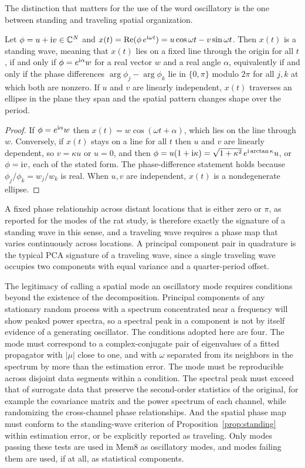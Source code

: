 The distinction that matters for the use of the word oscillatory is the one between standing and traveling spatial organization.

\begin{proposition}\label{prop:standing}
Let $\phi=u+\mathrm{i} v\in\mathbb{C}^N$ and $x(t)=\operatorname{Re}(\phi\,e^{\mathrm{i}\omega t})=u\cos\omega t-v\sin\omega t$. Then $x(t)$ is a standing wave, meaning that $x(t)$ lies on a fixed line through the origin for all $t$, if and only if $\phi=e^{\mathrm{i}\alpha}w$ for a real vector $w$ and a real angle $\alpha$, equivalently if and only if the phase differences $\arg\phi_j-\arg\phi_k$ lie in $\{0,\pi\}$ modulo $2\pi$ for all $j,k$ at which both are nonzero. If $u$ and $v$ are linearly independent, $x(t)$ traverses an ellipse in the plane they span and the spatial pattern changes shape over the period.
\end{proposition}

\begin{proof}
If $\phi=e^{\mathrm{i}\alpha}w$ then $x(t)=w\cos(\omega t+\alpha)$, which lies on the line through $w$. Conversely, if $x(t)$ stays on a line for all $t$ then $u$ and $v$ are linearly dependent, so $v=\kappa u$ or $u=0$, and then $\phi=u(1+\mathrm{i}\kappa)=\sqrt{1+\kappa^2}\,e^{\mathrm{i}\arctan\kappa}u$, or $\phi=\mathrm{i} v$, each of the stated form. The phase-difference statement holds because $\phi_j/\phi_k=w_j/w_k$ is real. When $u,v$ are independent, $x(t)$ is a nondegenerate ellipse.
\end{proof}

A fixed phase relationship across distant locations that is either zero or $\pi$, as reported for the modes of the rat study, is therefore exactly the signature of a standing wave in this sense, and a traveling wave requires a phase map that varies continuously across locations. A principal component pair in quadrature is the typical PCA signature of a traveling wave, since a single traveling wave occupies two components with equal variance and a quarter-period offset.

The legitimacy of calling a spatial mode an oscillatory mode requires conditions beyond the existence of the decomposition. Principal components of any stationary random process with a spectrum concentrated near a frequency will show peaked power spectra, so a spectral peak in a component is not by itself evidence of a generating oscillator. The conditions adopted here are four. The mode must correspond to a complex-conjugate pair of eigenvalues of a fitted propagator with $|\mu|$ close to one, and with $\omega$ separated from its neighbors in the spectrum by more than the estimation error. The mode must be reproducible across disjoint data segments within a condition. The spectral peak must exceed that of surrogate data that preserve the second-order statistics of the original, for example the covariance matrix and the power spectrum of each channel, while randomizing the cross-channel phase relationships. And the spatial phase map must conform to the standing-wave criterion of Proposition~\ref{prop:standing} within estimation error, or be explicitly reported as traveling. Only modes passing these tests are used in Mem8 as oscillatory modes, and modes failing them are used, if at all, as statistical components.

